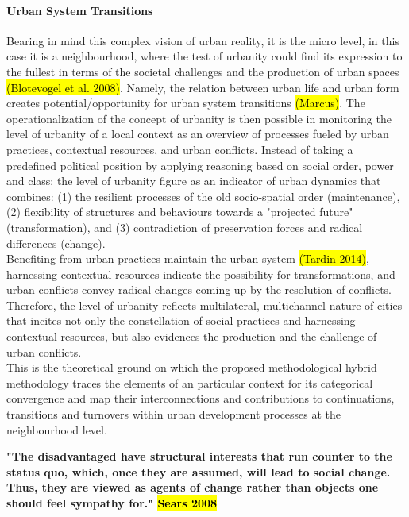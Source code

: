 \documentclass[11pt]{report}
\begin{document}
\paragraph{Urban System Transitions}

Bearing in mind this complex vision of urban reality, it is the micro level, in this case it is a neighbourhood, where the test of urbanity could find its expression to the fullest in terms of the societal challenges and the production of urban spaces \hl{(Blotevogel et al. 2008)}.
Namely, the relation between urban life and urban form creates potential/opportunity for urban system transitions \hl{(Marcus)}.
The operationalization of the concept of urbanity is then possible in monitoring the level of urbanity of a local context as an overview of processes fueled by urban practices, contextual resources, and urban conflicts.
Instead of taking a predefined political position by applying reasoning based on social order, power and class; the level of urbanity figure as an indicator of urban dynamics that combines: (1) the resilient processes of the old socio-spatial order (maintenance), (2) flexibility of structures and behaviours towards a "projected future" (transformation), and (3) contradiction of preservation forces and radical differences (change).
\\
Benefiting from urban practices maintain the urban system \hl{(Tardin 2014)}, harnessing contextual resources indicate the possibility for transformations, and urban conflicts convey radical changes coming up by the resolution of conflicts.
Therefore, the level of urbanity reflects multilateral, multichannel  nature of cities that incites not only the constellation of social practices and harnessing contextual resources, but also evidences the production and the challenge of urban conflicts.
\\
This is the theoretical ground on which the proposed methodological hybrid methodology traces the elements of an particular context for its categorical convergence and map their interconnections and contributions to continuations, transitions and turnovers within urban development processes at the neighbourhood level. 

\textbf{"The disadvantaged have structural interests that run counter to the status quo, which, once they are assumed, will lead to social change. Thus, they are viewed as agents of change rather than objects one should feel sympathy for." \hl{Sears 2008}}
\end{document}
